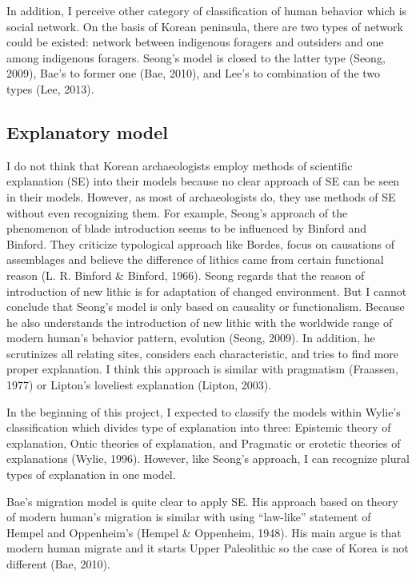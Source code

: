 \documentclass[american,man]{apa6}
\begin{document}
In addition, I perceive other category of classification of human
behavior which is social network. On the basis of Korean peninsula,
there are two types of network could be existed: network between
indigenous foragers and outsiders and one among indigenous foragers.
Seong's model is closed to the latter type (Seong, 2009), Bae's to
former one (Bae, 2010), and Lee's to combination of the two types (Lee,
2013).

\subsection{Explanatory model}\label{explanatory-model}

I do not think that Korean archaeologists employ methods of scientific
explanation (SE) into their models because no clear approach of SE can
be seen in their models. However, as most of archaeologists do, they use
methods of SE without even recognizing them. For example, Seong's
approach of the phenomenon of blade introduction seems to be influenced
by Binford and Binford. They criticize typological approach like Bordes,
focus on causations of assemblages and believe the difference of lithics
came from certain functional reason (L. R. Binford \& Binford, 1966).
Seong regards that the reason of introduction of new lithic is for
adaptation of changed environment. But I cannot conclude that Seong's
model is only based on causality or functionalism. Because he also
understands the introduction of new lithic with the worldwide range of
modern human's behavior pattern, evolution (Seong, 2009). In addition,
he scrutinizes all relating sites, considers each characteristic, and
tries to find more proper explanation. I think this approach is similar
with pragmatism (Fraassen, 1977) or Lipton's loveliest explanation
(Lipton, 2003).

In the beginning of this project, I expected to classify the models
within Wylie's classification which divides type of explanation into
three: Epistemic theory of explanation, Ontic theories of explanation,
and Pragmatic or erotetic theories of explanations (Wylie, 1996).
However, like Seong's approach, I can recognize plural types of
explanation in one model.

Bae's migration model is quite clear to apply SE. His approach based on
theory of modern human's migration is similar with using
\enquote{law-like} statement of Hempel and Oppenheim's (Hempel \&
Oppenheim, 1948). His main argue is that modern human migrate and it
starts Upper Paleolithic so the case of Korea is not different (Bae,
2010).
\end{document}
